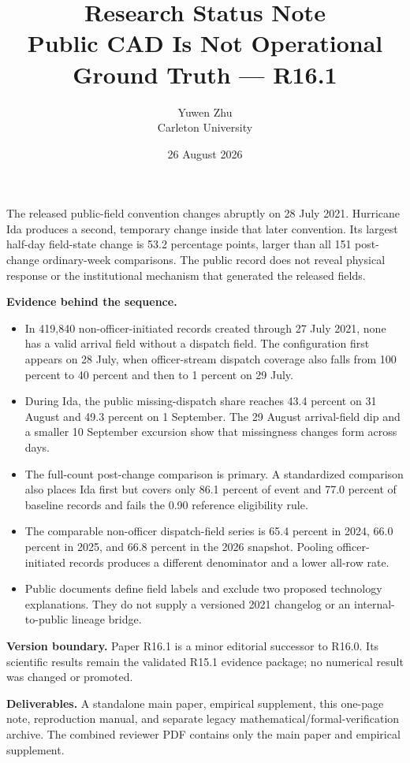 \documentclass[10pt]{article}
\title{\vspace{-2.2em}\textbf{Research Status Note}\\[0.25em]
\large Public CAD Is Not Operational Ground Truth --- R16.1}
\author{Yuwen Zhu\\Carleton University}
\date{26 August 2026}
\begin{document}
\maketitle
\thispagestyle{plain}
\vspace{-1.9em}

\begin{plainbox}[title=Four findings to retain]
The released public-field convention changes abruptly on 28 July 2021. Hurricane Ida produces a second, temporary change inside that later convention. Its largest half-day field-state change is 53.2 percentage points, larger than all 151 post-change ordinary-week comparisons. The public record does not reveal physical response or the institutional mechanism that generated the released fields.
\end{plainbox}

\noindent\textbf{Evidence behind the sequence.}
\begin{itemize}
\item In 419,840 non-officer-initiated records created through 27 July 2021, none has a valid arrival field without a dispatch field. The configuration first appears on 28 July, when officer-stream dispatch coverage also falls from 100 percent to 40 percent and then to 1 percent on 29 July.
\item During Ida, the public missing-dispatch share reaches 43.4 percent on 31 August and 49.3 percent on 1 September. The 29 August arrival-field dip and a smaller 10 September excursion show that missingness changes form across days.
\item The full-count post-change comparison is primary. A standardized comparison also places Ida first but covers only 86.1 percent of event and 77.0 percent of baseline records and fails the 0.90 reference eligibility rule.
\item The comparable non-officer dispatch-field series is 65.4 percent in 2024, 66.0 percent in 2025, and 66.8 percent in the 2026 snapshot. Pooling officer-initiated records produces a different denominator and a lower all-row rate.
\item Public documents define field labels and exclude two proposed technology explanations. They do not supply a versioned 2021 changelog or an internal-to-public lineage bridge.
\end{itemize}

\noindent\textbf{Version boundary.} Paper R16.1 is a minor editorial successor to R16.0. Its scientific results remain the validated R15.1 evidence package; no numerical result was changed or promoted.

\noindent\textbf{Deliverables.} A standalone main paper, empirical supplement, this one-page note, reproduction manual, and separate legacy mathematical/formal-verification archive. The combined reviewer PDF contains only the main paper and empirical supplement.
\end{document}

